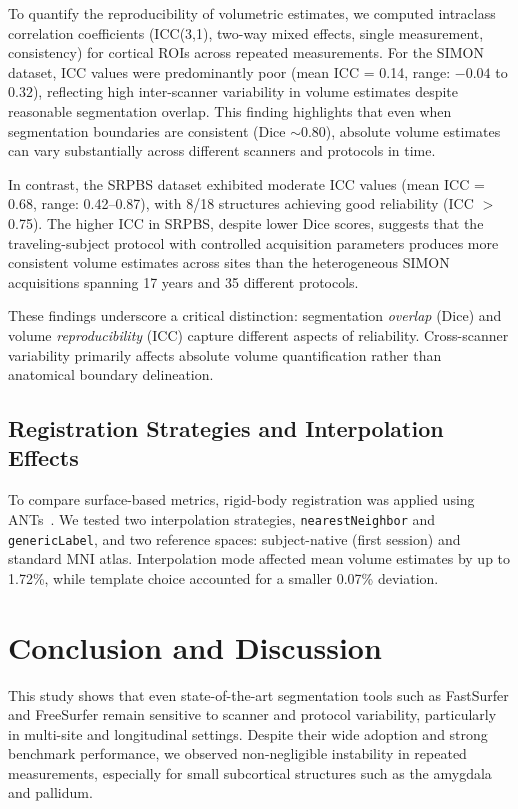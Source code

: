 \documentclass{midl} %
\begin{document}
To quantify the reproducibility of volumetric estimates, we computed intraclass correlation coefficients (ICC(3,1), two-way mixed effects, single measurement, consistency) for cortical ROIs across repeated measurements. For the SIMON dataset, ICC values were predominantly poor (mean ICC = 0.14, range: $-0.04$ to $0.32$), reflecting high inter-scanner variability in volume estimates despite reasonable segmentation overlap. This finding highlights that even when segmentation boundaries are consistent (Dice $\sim$0.80), absolute volume estimates can vary substantially across different scanners and protocols in time. 

In contrast, the SRPBS dataset exhibited moderate ICC values (mean ICC = 0.68, range: 0.42--0.87), with 8/18 structures achieving good reliability (ICC $>$ 0.75). The higher ICC in SRPBS, despite lower Dice scores, suggests that the traveling-subject protocol with controlled acquisition parameters produces more consistent volume estimates across sites than the heterogeneous SIMON acquisitions spanning 17 years and 35 different protocols.

These findings underscore a critical distinction: segmentation \textit{overlap} (Dice) and volume \textit{reproducibility} (ICC) capture different aspects of reliability. Cross-scanner variability primarily affects absolute volume quantification rather than anatomical boundary delineation.

\subsection{Registration Strategies and Interpolation Effects}
To compare surface-based metrics, rigid-body registration was applied using ANTs~\cite{Avants2011}. We tested two interpolation strategies, \texttt{nearestNeighbor} and \texttt{genericLabel}, and two reference spaces: subject-native (first session) and standard MNI atlas. Interpolation mode affected mean volume estimates by up to 1.72\%, while template choice accounted for a smaller 0.07\% deviation.  



\section{Conclusion and Discussion}

This study shows that even state-of-the-art segmentation tools such as FastSurfer and FreeSurfer remain sensitive to scanner and protocol variability, particularly in multi-site and longitudinal settings. Despite their wide adoption and strong benchmark performance, we observed non-negligible instability in repeated measurements, especially for small subcortical structures such as the amygdala and pallidum.
\end{document}
